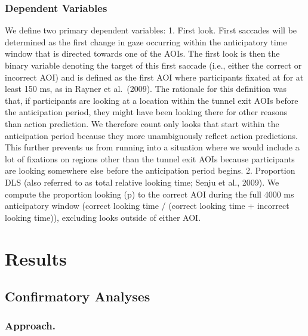 \documentclass[
  english,
  man,floatsintext]{apa6}
\begin{document}
\hypertarget{dependent-variables}{%
\subsubsection{Dependent Variables}\label{dependent-variables}}

We define two primary dependent variables:
1. First look. First saccades will be determined as the first change in gaze occurring within the anticipatory time window that is directed towards one of the AOIs. The first look is then the binary variable denoting the target of this first saccade (i.e., either the correct or incorrect AOI) and is defined as the first AOI where participants fixated at for at least 150 ms, as in Rayner et al.~(2009). The rationale for this definition was that, if participants are looking at a location within the tunnel exit AOIs before the anticipation period, they might have been looking there for other reasons than action prediction. We therefore count only looks that start within the anticipation period because they more unambiguously reflect action predictions. This further prevents us from running into a situation where we would include a lot of fixations on regions other than the tunnel exit AOIs because participants are looking somewhere else before the anticipation period begins.
2. Proportion DLS (also referred to as total relative looking time; Senju et al., 2009). We compute the proportion looking (p) to the correct AOI during the full 4000 ms anticipatory window (correct looking time / (correct looking time + incorrect looking time)), excluding looks outside of either AOI.

\hypertarget{results}{%
\section{Results}\label{results}}

\hypertarget{confirmatory-analyses}{%
\subsection{Confirmatory Analyses}\label{confirmatory-analyses}}

\hypertarget{approach.}{%
\subsubsection{Approach.}\label{approach.}}
\end{document}
